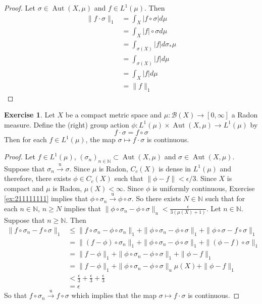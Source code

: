 \documentclass[12pt]{amsart}
\theoremstyle{definition}
\newtheorem{ex}[definition]{Exercise}
\newcommand{\ep}{\epsilon}
\newcommand{\sig}{\sigma}
\newcommand{\N}{\mathbb{N}}
\newcommand{\MB}{\mathcal{B}}
\newcommand{\RG}{[0,\infty]}
\newcommand{\convt}[1]{\xrightarrow{\text{#1}}}
\DeclareMathOperator{\Aut}{Aut}
\newcommand{\lex}[1]{\label{ex:#1}}
\newcommand{\rex}[1]{Exercise \ref{ex:#1}}
\begin{document}
	\begin{proof}
	Let $\sig \in \Aut(X, \mu)$ and $f \in L^1(\mu)$. 
Then 
	\begin{align*}
	\|f \cdot \sig\|_1
	&=  \int_X |f \circ \sig| d\mu \\
	&=  \int_X |f| \circ \sig d\mu \\
	&=  \int_{\sig(X)} |f| d \sig_* \mu  \\
	&=  \int_{\sig(X)} |f| d \mu \\
	&=  \int_{X} |f| d \mu \\
	&= \|f\|_1 
	\end{align*}	 
	\end{proof}
	
	\begin{ex} \lex{}
	Let $X$ be a compact metric space and $\mu:\MB(X) \rightarrow \RG$ a Radon measure. Define the (right) group action $\phi: L^1(\mu) \times \Aut(X, \mu) \rightarrow L^1(\mu) $ by 
	$$f \cdot \sig = f \circ \sig$$	
	Then for each $f \in L^1(\mu)$, the map $\sig \mapsto  f \cdot \sig$ is continuous.  
	\end{ex}
	
	\begin{proof}
	Let $f \in L^1(\mu)$, $(\sig_n)_{n \in \N} \subset \Aut(X, \mu)$ and $\sig \in \Aut(X, \mu)$. Suppose that $\sig_n \convt{u} \sig$. Since $\mu$ is Radon, $C_c(X)$ is dense in $L^1(\mu)$ and therefore, there exists $\phi \in C_c(X)$ such that $\|\phi - f\| < \ep/3$. Since $X$ is compact and $\mu$ is Radon, $\mu(X) < \infty$. Since $\phi$ is uniformly continuous, \rex{211111111} implies that $\phi \circ \sig_n \convt{u} \phi \circ \sig$.  So there exists $N \in \N$ such that for each $n \in \N$, $n \geq N$ implies that $\|\phi \circ \sig_n - \phi \circ \sig\|_u < \frac{\ep}{3 (\mu(X)+1)}$. Let $n \in \N$. Suppose that $n \geq \N$. Then 
	\begin{align*}
	\|f \circ \sig_n - f \circ \sig\|_1 
	&\leq \|f \circ \sig_n - \phi \circ \sig_n \|_1 + \|\phi \circ \sig_n - \phi \circ \sig\|_1 + \|\phi \circ \sig - f \circ \sig\|_1 \\
	& = \|(f - \phi) \circ \sig_n \|_1 + \|\phi \circ \sig_n - \phi \circ \sig\|_1 + \|(\phi - f) \circ \sig\|_1 \\
	&= \|f - \phi  \|_1 + \|\phi \circ \sig_n - \phi \circ \sig\|_1 + \|\phi - f \|_1 \\
	&= \|f - \phi  \|_1 + \|\phi \circ \sig_n - \phi \circ \sig\|_u \mu(X) + \|\phi - f \|_1 \\
	&< \frac{\ep}{3} + \frac{\ep}{3} + \frac{\ep}{3} \\
	&= \ep
	\end{align*}
	So that $f \circ \sig_n \convt{u} f \circ \sig$ which implies that the map $\sig \mapsto  f \cdot \sig$ is continuous. 
	\end{proof}
	
\end{document}
